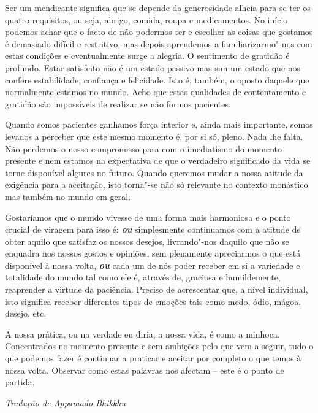 \enlargethispage{\baselineskip}

Ser um mendicante significa que se depende da generosidade alheia para
se ter os quatro requisitos, ou seja, abrigo, comida, roupa e
medicamentos. No início podemos achar que o facto de não podermos ter e
escolher as coisas que gostamos é demasiado difícil e restritivo, mas
depois aprendemos a familiarizarmo"-nos com estas condições e
eventualmente surge a alegria. O sentimento de gratidão é profundo.
Estar satisfeito não é um estado passivo mas sim um estado que nos
confere estabilidade, confiança e felicidade. Isto é, também, o oposto
daquele que normalmente estamos no mundo. Acho que estas qualidades de
contentamento e gratidão são impossíveis de realizar se não formos
pacientes.

Quando somos pacientes ganhamos força interior e, ainda mais importante,
somos levados a perceber que este mesmo momento é, por si só, pleno.
Nada lhe falta. Não perdemos o nosso compromisso para com o imediatismo
do momento presente e nem estamos na expectativa de que o verdadeiro
significado da vida se torne disponível algures no futuro. Quando
queremos mudar a nossa atitude da exigência para a aceitação, isto
torna"-se não só relevante no contexto monástico mas também no mundo em
geral.

Gostaríamos que o mundo vivesse de uma forma mais harmoniosa e o ponto
crucial de viragem para isso é: \emph{\textbf{ou}} simplesmente
continuamos com a atitude de obter aquilo que satisfaz os nossos
desejos, livrando"-nos daquilo que não se enquadra nos nossos gostos e
opiniões, sem plenamente apreciarmos o que está disponível à nossa
volta, \emph{\textbf{ou}} cada um de nós poder receber em si a variedade
e totalidade do mundo tal como ele é, através de, graciosa e
humildemente, reaprender a virtude da paciência. Preciso de acrescentar
que, a nível individual, isto significa receber diferentes tipos de
emoções tais como medo, ódio, mágoa, desejo, etc.

A nossa prática, ou na verdade eu diria, a nossa vida, é como a minhoca.
Concentrados no momento presente e sem ambições pelo que vem a seguir,
tudo o que podemos fazer é continuar a praticar e aceitar por completo o
que temos à nossa volta. Observar como estas palavras nos afectam --
este é o ponto de partida.

\vfill
{\raggedleft\itshape\small
  Tradução de Appamādo Bhikkhu
\par}
